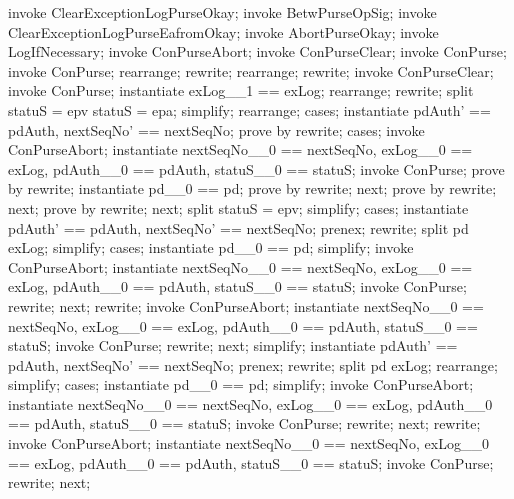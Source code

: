 \begin{LPScript}\begin{zproof}[tClearExceptionLogEafromOkayPRE]
    invoke ClearExceptionLogPurseOkay;
    invoke BetwPurseOpSig;
    invoke ClearExceptionLogPurseEafromOkay;
    invoke AbortPurseOkay;
    invoke LogIfNecessary;
    invoke \Xi ConPurseAbort;
    invoke \Xi ConPurseClear;
    invoke \Delta ConPurse;
    invoke ConPurse;
    rearrange;
    rewrite;
    rearrange;
    rewrite;
    invoke ConPurseClear;
    invoke ConPurse;
    instantiate exLog\_\_1 == exLog;
    rearrange;
    rewrite;
    split \lnot statuS = epv \land \lnot statuS = epa;
    simplify;
    rearrange;
    cases;
    instantiate pdAuth' == pdAuth, nextSeqNo' == nextSeqNo;
    prove by rewrite;
    cases;
    invoke ConPurseAbort;
    instantiate nextSeqNo\_\_0 == nextSeqNo, exLog\_\_0 == exLog,
        pdAuth\_\_0 == pdAuth, statuS\_\_0 == statuS;
    invoke ConPurse;
    prove by rewrite;
    instantiate pd\_\_0 == pd;
    prove by rewrite;
    next;
    prove by rewrite;
    next;
    prove by rewrite;
    next;
    split statuS = epv;
    simplify;
    cases;
    instantiate pdAuth' == pdAuth, nextSeqNo' == nextSeqNo;
    prenex;
    rewrite;
    split pd \in exLog;
    simplify;
    cases;
    instantiate pd\_\_0 == pd;
    simplify;
    invoke ConPurseAbort;
    instantiate nextSeqNo\_\_0 == nextSeqNo, exLog\_\_0 == exLog,
        pdAuth\_\_0 == pdAuth, statuS\_\_0 == statuS;
    invoke ConPurse;
    rewrite;
    next;
    rewrite;
    invoke ConPurseAbort;
    instantiate nextSeqNo\_\_0 == nextSeqNo, exLog\_\_0 == exLog,
        pdAuth\_\_0 == pdAuth, statuS\_\_0 == statuS;
    invoke ConPurse;
    rewrite;
    next;
    simplify;
    instantiate pdAuth' == pdAuth, nextSeqNo' == nextSeqNo;
    prenex;
    rewrite;
    split pd \in exLog;
    rearrange;
    simplify;
    cases;
    instantiate pd\_\_0 == pd;
    simplify;
    invoke ConPurseAbort;
    instantiate nextSeqNo\_\_0 == nextSeqNo, exLog\_\_0 == exLog,
        pdAuth\_\_0 == pdAuth, statuS\_\_0 == statuS;
    invoke ConPurse;
    rewrite;
    next;
    rewrite;
    invoke ConPurseAbort;
    instantiate nextSeqNo\_\_0 == nextSeqNo, exLog\_\_0 == exLog,
        pdAuth\_\_0 == pdAuth, statuS\_\_0 == statuS;
    invoke ConPurse;
    rewrite;
    next;
\end{zproof}\end{LPScript}

